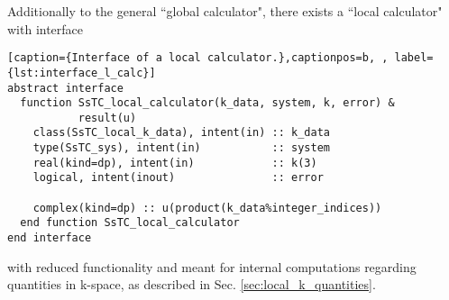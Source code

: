 \documentclass[10pt,a4paper]{article}
\begin{document}
Additionally to the general ``global calculator", there exists a ``local calculator" with interface
\begin{lstlisting}[caption={Interface of a local calculator.},captionpos=b, , label={lst:interface_l_calc}]
abstract interface
  function SsTC_local_calculator(k_data, system, k, error) &
           result(u)
    class(SsTC_local_k_data), intent(in) :: k_data
    type(SsTC_sys), intent(in)           :: system
    real(kind=dp), intent(in)            :: k(3)
    logical, intent(inout)               :: error

    complex(kind=dp) :: u(product(k_data%integer_indices))
  end function SsTC_local_calculator
end interface
\end{lstlisting}
with reduced functionality and meant for internal computations regarding quantities in k-space, as described in Sec. \ref{sec:local_k_quantities}.
\end{document}
